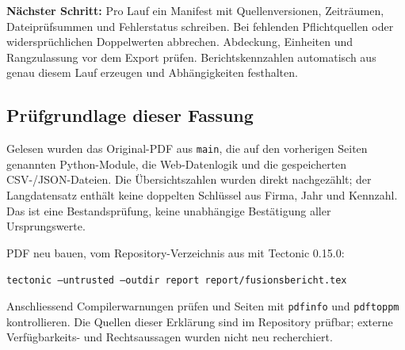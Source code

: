 \documentclass[11pt,a4paper]{article}
\begin{document}
\textbf{Nächster Schritt:} Pro Lauf ein Manifest mit Quellenversionen, Zeiträumen, Dateiprüfsummen und Fehlerstatus schreiben. Bei fehlenden Pflichtquellen oder widersprüchlichen Doppelwerten abbrechen. Abdeckung, Einheiten und Rangzulassung vor dem Export prüfen. Berichtskennzahlen automatisch aus genau diesem Lauf erzeugen und Abhängigkeiten festhalten.

\subsection*{Prüfgrundlage dieser Fassung}
{\small Gelesen wurden das Original-PDF aus \texttt{main}, die auf den vorherigen Seiten genannten Python-Module, die Web-Datenlogik und die gespeicherten CSV-/JSON-Dateien. Die Übersichtszahlen wurden direkt nachgezählt; der Langdatensatz enthält keine doppelten Schlüssel aus Firma, Jahr und Kennzahl. Das ist eine Bestandsprüfung, keine unabhängige Bestätigung aller Ursprungswerte.}

{\small PDF neu bauen, vom Repository-Verzeichnis aus mit Tectonic 0.15.0:\par
\texttt{tectonic --untrusted --outdir report report/fusionsbericht.tex}\par
Anschliessend Compilerwarnungen prüfen und Seiten mit \texttt{pdfinfo} und \texttt{pdftoppm} kontrollieren. Die Quellen dieser Erklärung sind im Repository prüfbar; externe Verfügbarkeits- und Rechtsaussagen wurden nicht neu recherchiert.}
\end{document}
